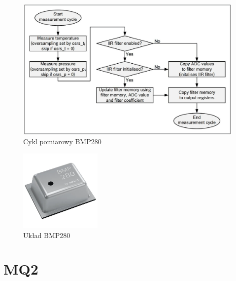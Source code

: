 \begin{figure}[H]
    \centering
    \includegraphics[width=\textwidth, height=\textheight, keepaspectratio]{Graphics/bmp280_sampling.jpg}
    \caption{Cykl pomiarowy BMP280\cite{bmp_datasheet}}
    \label{img:bmp_sampling}
\end{figure}

\begin{figure}[H]
    \centering
    \includegraphics[width=4cm]{Graphics/bmp_img.png}
    \caption{Układ BMP280\cite{bmp_mouser}}
    \label{img:bmp_mouser}
\end{figure}

\section{MQ2}

